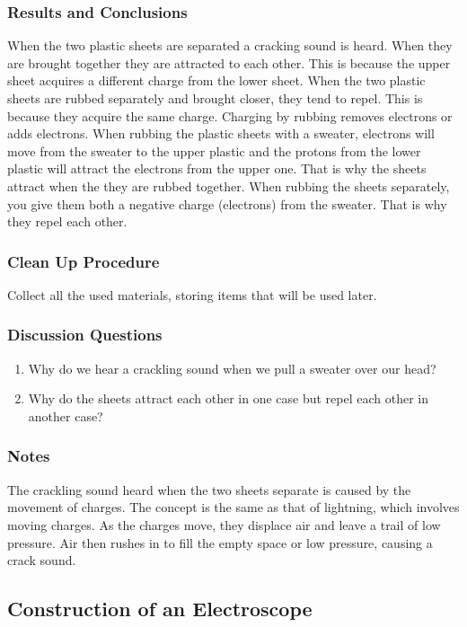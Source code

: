 \subsubsection*{Results and Conclusions}
When the two plastic sheets are separated a cracking sound is heard. When they are brought together they are attracted to each other. This is because the upper sheet acquires a different charge from the lower sheet. 
When the two plastic sheets are rubbed separately and brought closer, they tend to repel. This is because they acquire the same charge. 
Charging by rubbing removes electrons or adds electrons. When rubbing the plastic sheets with a sweater, electrons will move from the sweater to the upper plastic and the protons from the lower plastic will attract the electrons from the upper one. That is why the sheets attract when the they are rubbed together. When rubbing the sheets separately, you give them both a negative charge (electrons) from the sweater. That is why they repel each other. 

\subsubsection*{Clean Up Procedure}
Collect all the used materials, storing items that will be used later.

\subsubsection*{Discussion Questions}
\begin{enumerate}
\item{Why do we hear a crackling sound when we pull a sweater over our head?}
\item{Why do the sheets attract each other in one case but repel each other in another case?}
\end{enumerate}

\subsubsection*{Notes}
The crackling sound heard when the two sheets separate is caused by the movement of charges. The concept is the same as that of lightning, which involves moving charges. As the charges move, they displace air and leave a trail of low pressure. Air then rushes in to fill the empty space or low pressure, causing a crack sound. 

\subsection{Construction of an Electroscope}

